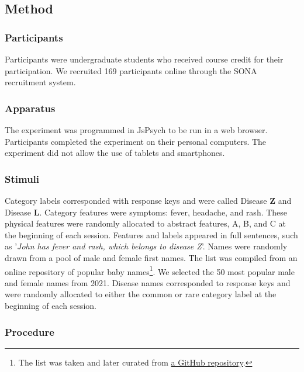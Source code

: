 \documentclass[10pt,letterpaper]{article}
\begin{document}
\subsection{Method}

\subsubsection{Participants}

Participants were undergraduate students who received course credit for their participation.
We recruited 169 participants online through the SONA recruitment system.

\subsubsection{Apparatus}

The experiment was programmed in JsPsych \cite{deleeuw2015JsPsych} to be run in a web browser.
Participants completed the experiment on their personal computers.
The experiment did not allow the use of tablets and smartphones.

\subsubsection{Stimuli}

Category labels corresponded with response keys and were called Disease \textbf{Z} and Disease \textbf{L}.
Category features were symptoms: fever, headache, and rash.
These physical features were randomly allocated to abstract features, A, B, and C at the beginning of each session.
Features and labels appeared in full sentences, such as '\textit{John has fever and rash, which belongs to disease Z}'.
Names were randomly drawn from a pool of male and female first names.
The list was compiled from an online repository of popular baby names\footnote[1]{The list was taken and later curated from \href{https://github.com/aruljohn/popular-baby-names}{a GitHub repository}.}.
We selected the 50 most popular male and female names from 2021.
Disease names corresponded to response keys and were randomly allocated to either the common or rare category label at the beginning of each session.

\subsubsection{Procedure}
\end{document}
